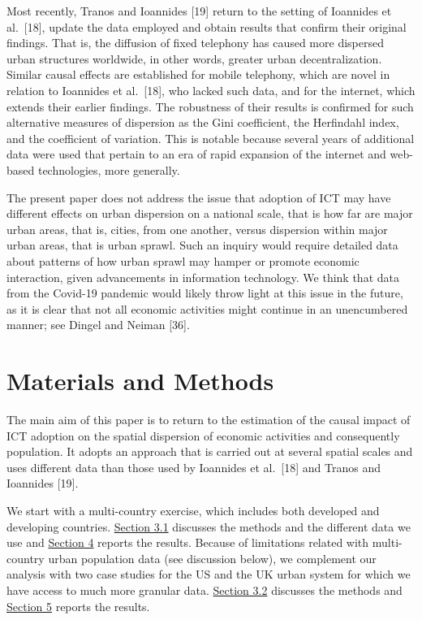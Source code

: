 \documentclass[10pt,letterpaper]{article}
\begin{document}
Most recently, Tranos and Ioannides {[}19{]} return to the setting of
Ioannides et al.~{[}18{]}, update the data employed and obtain results
that confirm their original findings. That is, the diffusion of fixed
telephony has caused more dispersed urban structures worldwide, in other
words, greater urban decentralization. Similar causal effects are
established for mobile telephony, which are novel in relation to
Ioannides et al.~{[}18{]}, who lacked such data, and for the internet,
which extends their earlier findings. The robustness of their results is
confirmed for such alternative measures of dispersion as the Gini
coefficient, the Herfindahl index, and the coefficient of variation.
This is notable because several years of additional data were used that
pertain to an era of rapid expansion of the internet and web-based
technologies, more generally.

\color{blue}

The present paper does not address the issue that adoption of ICT may
have different effects on urban dispersion on a national scale, that is
how far are major urban areas, that is, cities, from one another, versus
dispersion within major urban areas, that is urban sprawl. Such an
inquiry would require detailed data about patterns of how urban sprawl
may hamper or promote economic interaction, given advancements in
information technology. We think that data from the Covid-19 pandemic
would likely throw light at this issue in the future, as it is clear
that not all economic activities might continue in an unencumbered
manner; see Dingel and Neiman {[}36{]}. \color{black}

\hypertarget{sec3}{%
\section{Materials and Methods}\label{sec3}}

The main aim of this paper is to return to the estimation of the causal
impact of ICT adoption on the spatial dispersion of economic activities
and consequently population. It adopts an approach that is carried out
at several spatial scales and uses different data than those used by
Ioannides et al.~{[}18{]} and Tranos and Ioannides {[}19{]}.

We start with a multi-country exercise, which includes both developed
and developing countries. \protect\hyperlink{sec3.1}{Section 3.1}
discusses the methods and the different data we use and
\protect\hyperlink{sec4}{Section 4} reports the results. Because of
limitations related with multi-country urban population data (see
discussion below), we complement our analysis with two case studies for
the US and the UK urban system for which we have access to much more
granular data. \protect\hyperlink{sec3.2}{Section 3.2} discusses the
methods and \protect\hyperlink{sec5}{Section 5} reports the results.
\end{document}
